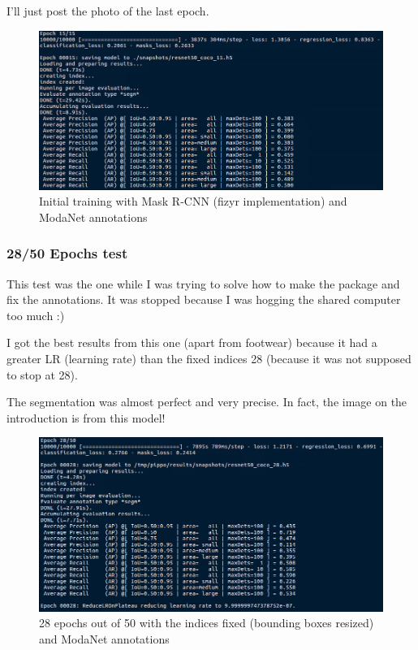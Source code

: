 I'll just post the photo of the last epoch.

\begin{figure}[H]
	\centering
	\includegraphics[width=\linewidth]{figures/train/initial}
	\caption{Initial training with Mask R-CNN (fizyr implementation) and ModaNet annotations}
	\label{f:train-initial}
\end{figure}


\subsubsection{28/50 Epochs test}

This test was the one while I was trying to solve how to make the package and fix the annotations.
It was stopped because I was hogging the shared computer too much :)

I got the best results from this one (apart from footwear) because it had a greater LR (learning rate) than the fixed indices 28 (because it was not supposed to stop at 28).

The segmentation was almost perfect and very precise. In fact, the image on the introduction is from this model!

\begin{figure}[H]
	\centering
	\includegraphics[width=\linewidth]{figures/train/28-50}
	\caption{28 epochs out of 50 with the indices fixed (bounding boxes resized) and ModaNet annotations}
	\label{f:train-28-50}
\end{figure}

